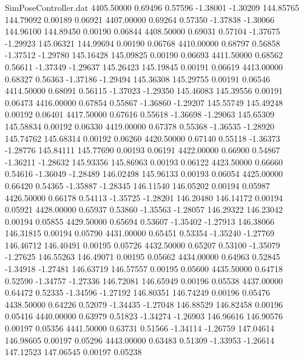 \begin{filecontents}{SimPoseController.dat}
4405.50000    0.69496    0.57596    -1.38001   -1.30209  144.85765  144.79092    0.00189    0.06921
4407.00000    0.69264    0.57350    -1.37838   -1.30066  144.96100  144.89450    0.00190    0.06844
4408.50000    0.69031    0.57104    -1.37675   -1.29923  145.06321  144.99694    0.00190    0.06768
4410.00000    0.68797    0.56858    -1.37512   -1.29780  145.16428  145.09825    0.00190    0.06693
4411.50000    0.68562    0.56611    -1.37349   -1.29637  145.26423  145.19845    0.00191    0.06619
4413.00000    0.68327    0.56363    -1.37186   -1.29494  145.36308  145.29755    0.00191    0.06546
4414.50000    0.68091    0.56115    -1.37023   -1.29350  145.46083  145.39556    0.00191    0.06473
4416.00000    0.67854    0.55867    -1.36860   -1.29207  145.55749  145.49248    0.00192    0.06401
4417.50000    0.67616    0.55618    -1.36698   -1.29063  145.65309  145.58834    0.00192    0.06330
4419.00000    0.67378    0.55368    -1.36535   -1.28920  145.74762  145.68314    0.00192    0.06260
4420.50000    0.67140    0.55118    -1.36373   -1.28776  145.84111  145.77690    0.00193    0.06191
4422.00000    0.66900    0.54867    -1.36211   -1.28632  145.93356  145.86963    0.00193    0.06122
4423.50000    0.66660    0.54616    -1.36049   -1.28489  146.02498  145.96133    0.00193    0.06054
4425.00000    0.66420    0.54365    -1.35887   -1.28345  146.11540  146.05202    0.00194    0.05987
4426.50000    0.66178    0.54113    -1.35725   -1.28201  146.20480  146.14172    0.00194    0.05921
4428.00000    0.65937    0.53860    -1.35563   -1.28057  146.29322  146.23042    0.00194    0.05855
4429.50000    0.65694    0.53607    -1.35402   -1.27913  146.38066  146.31815    0.00194    0.05790
4431.00000    0.65451    0.53354    -1.35240   -1.27769  146.46712  146.40491    0.00195    0.05726
4432.50000    0.65207    0.53100    -1.35079   -1.27625  146.55263  146.49071    0.00195    0.05662
4434.00000    0.64963    0.52845    -1.34918   -1.27481  146.63719  146.57557    0.00195    0.05600
4435.50000    0.64718    0.52590    -1.34757   -1.27336  146.72081  146.65949    0.00196    0.05538
4437.00000    0.64472    0.52335    -1.34596   -1.27192  146.80351  146.74249    0.00196    0.05476
4438.50000    0.64226    0.52079    -1.34435   -1.27048  146.88529  146.82458    0.00196    0.05416
4440.00000    0.63979    0.51823    -1.34274   -1.26903  146.96616  146.90576    0.00197    0.05356
4441.50000    0.63731    0.51566    -1.34114   -1.26759  147.04614  146.98605    0.00197    0.05296
4443.00000    0.63483    0.51309    -1.33953   -1.26614  147.12523  147.06545    0.00197    0.05238

\end{filecontents}
